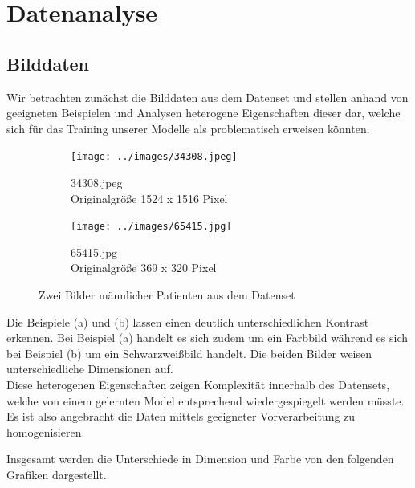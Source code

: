 \chapter{Datenanalyse}
\label{ch:data_analysis}

\section{Bilddaten}
\newlength{\imagewidth}

Wir betrachten zunächst die Bilddaten aus dem Datenset und stellen anhand von geeigneten Beispielen und Analysen heterogene Eigenschaften dieser dar, welche sich für das Training unserer Modelle als problematisch erweisen könnten.

\begin{figure}[ht]
	\centering
	\begin{subfigure}[b]{0.45\textwidth}
		\texttt{[image: ../images/34308.jpeg]}
		\caption{34308.jpeg\\Originalgröße 1524 x 1516 Pixel}
	\end{subfigure} \hfill
	\begin{subfigure}[b]{0.45\textwidth}
		\texttt{[image: ../images/65415.jpg]}
		\caption{65415.jpg\\Originalgröße 369 x 320 Pixel}
	\end{subfigure}
	\caption{Zwei Bilder männlicher Patienten aus dem Datenset}
\end{figure}

Die Beispiele (a) und (b) lassen einen deutlich unterschiedlichen Kontrast erkennen. Bei Beispiel (a) handelt es sich zudem um ein Farbbild während es sich bei Beispiel (b) um ein Schwarzweißbild handelt. Die beiden Bilder weisen unterschiedliche Dimensionen auf.\\
Diese heterogenen Eigenschaften zeigen Komplexität innerhalb des Datensets, welche von einem gelernten Model entsprechend wiedergespiegelt werden müsste. Es ist also angebracht die Daten mittels geeigneter Vorverarbeitung zu homogenisieren.

\pagebreak

Insgesamt werden die Unterschiede in Dimension und Farbe von den folgenden Grafiken dargestellt.

